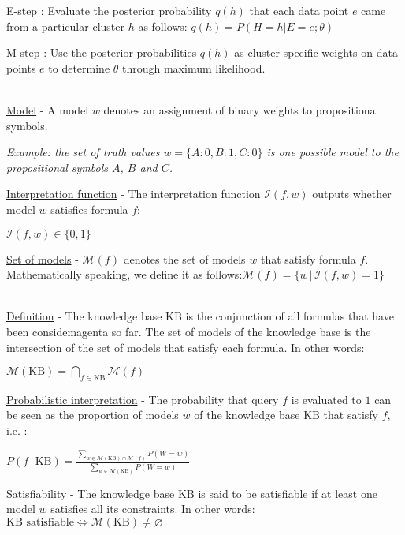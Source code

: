 \documentclass[4pt,landscape]{article}
\begin{document}
\begin{multicols*}{4}
 {\tiny \textrm{E-step} : Evaluate the posterior probability $q(h)$ that each data point $e$ came from a particular cluster $h$ as follows: $q(h)=P(H=h|E=e;\theta)$}\par
 {\tiny \textrm{M-step} : Use the posterior probabilities $q(h)$ as cluster specific weights on data points $e$ to determine $\theta$ through maximum likelihood.}\par 
 {\color{yellow} \hrulefill}\\
 {\tiny \underline{Model} - A model $w$ denotes an assignment of binary weights to propositional symbols.}\par
 {\tiny \textit{Example: the set of truth values $w = \{A:0, B:1, C:0\}$ is one possible model to the propositional symbols $A$, $B$ and $C$.}}\par
 {\tiny \underline{Interpretation function} - The interpretation function $\mathcal{I}(f,w)$ outputs whether model $w$ satisfies formula $f$:}\par
 {\tiny $\mathcal{I}(f,w)\in\{0,1\}$}\par
 {\tiny \underline{Set of models} - $\mathcal{M}(f)$ denotes the set of models $w$ that satisfy formula $f$. Mathematically speaking, we define it as follows:$\mathcal{M}(f) = \{w\, |\, \mathcal{I}(f,w)=1\}$}\par
  {\color{yellow} \hrulefill}\\
 {\tiny \underline{Definition} - The knowledge base $\textrm{KB}$ is the conjunction of all formulas that have been considemagenta so far. The set of models of the knowledge base is the intersection of the set of models that satisfy each formula. In other words:}\par
 {\tiny $\mathcal{M}(\textrm{KB})=\bigcap_{f\in\textrm{KB}}\mathcal{M}(f)$}\par
 {\tiny \underline{Probabilistic interpretation} - The probability that query $f$ is evaluated to $1$ can be seen as the proportion of models $w$ of the knowledge base $\textrm{KB}$ that satisfy $f$, i.e. :}\par
 {\tiny $P(f\,|\,\textrm{KB})=\frac{\displaystyle\sum_{w\in\mathcal{M}(\textrm{KB})\cap\mathcal{M}(f)}P(W=w)}{\displaystyle\sum_{w\in\mathcal{M}(\textrm{KB})}P(W=w)}$}\par
 {\tiny \underline{Satisfiability} - The knowledge base $\textrm{KB}$ is said to be satisfiable if at least one model $w$ satisfies all its constraints. In other words: $\textrm{KB satisfiable}\Longleftrightarrow\mathcal{M}(\textrm{KB})\neq\varnothing$}\par

\end{multicols*}
\end{document}
